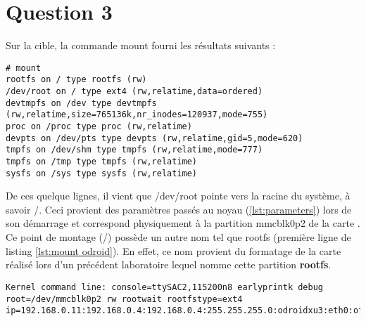 
\chapter{Question 3} %

\label{Question 3} %


Sur la cible, la commande mount fourni les résultats suivants :
\begin{lstlisting}[label=lst:mount odroid]
# mount
rootfs on / type rootfs (rw)
/dev/root on / type ext4 (rw,relatime,data=ordered)
devtmpfs on /dev type devtmpfs (rw,relatime,size=765136k,nr_inodes=120937,mode=755)
proc on /proc type proc (rw,relatime)
devpts on /dev/pts type devpts (rw,relatime,gid=5,mode=620)
tmpfs on /dev/shm type tmpfs (rw,relatime,mode=777)
tmpfs on /tmp type tmpfs (rw,relatime)
sysfs on /sys type sysfs (rw,relatime)
\end{lstlisting}
De ces quelque lignes, il vient que /dev/root pointe vers la racine du système, à savoir /. Ceci provient des paramètres passés au noyau (\ref{lst:parameters}) lors de son démarrage et correspond physiquement à la partition mmcblk0p2 de la carte \usd. Ce point de montage (/) possède un autre nom tel que rootfs (première ligne de listing \ref{lst:mount odroid}). En effet, ce nom provient du formatage de la carte \usd réalisé lors d'un précédent laboratoire lequel nomme cette partition \textbf{rootfs}.

\begin{lstlisting}[caption=Paramètres du noyau, label=lst:parameters]
Kernel command line: console=ttySAC2,115200n8 earlyprintk debug root=/dev/mmcblk0p2 rw rootwait rootfstype=ext4 ip=192.168.0.11:192.168.0.4:192.168.0.4:255.255.255.0:odroidxu3:eth0:off
\end{lstlisting}

